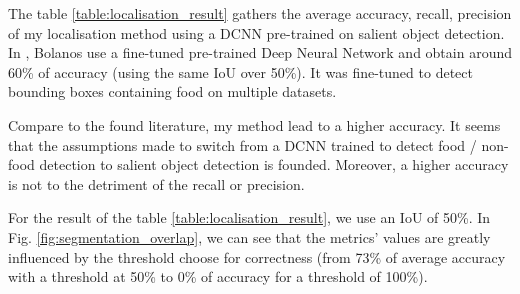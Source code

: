 The table \ref{table:localisation_result} gathers the average accuracy, recall, precision of my localisation method using a DCNN pre-trained on salient object detection. In \cite{Bolanos2016}, Bolanos use a fine-tuned pre-trained Deep Neural Network and obtain around 60\% of accuracy (using the same IoU over 50\%). It was fine-tuned to detect bounding boxes containing food on multiple datasets.

Compare to the found literature, my method lead to a higher accuracy. It seems that the assumptions made to switch from a DCNN trained to detect food / non-food detection to salient object detection is founded. Moreover, a higher accuracy is not to the detriment of the recall or precision.

For the result of the table \ref{table:localisation_result}, we use an IoU of 50\%. In Fig. \ref{fig:segmentation_overlap}, we can see that the metrics' values are greatly influenced by the threshold choose for correctness (from 73\% of average accuracy with a threshold at 50\% to 0\% of accuracy for a threshold of 100\%).

